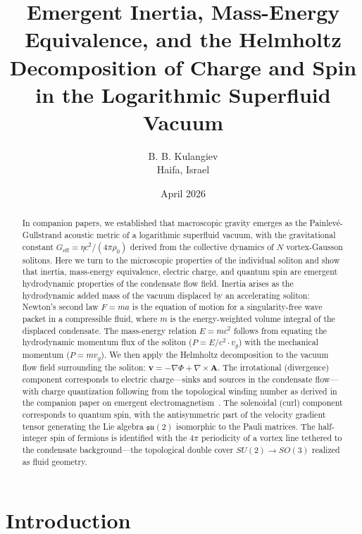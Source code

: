\documentclass[12pt, a4paper]{article}
\newcommand{\Geff}{G_{\mathrm{eff}}}
\begin{document}
\title{Emergent Inertia, Mass-Energy Equivalence, and the Helmholtz Decomposition of Charge and Spin\\
in the Logarithmic Superfluid Vacuum}

\author{B. B. Kulangiev\\\small{Haifa, Israel}}
\date{April 2026}
\maketitle

\begin{abstract}
\noindent
In companion papers, we established that macroscopic
gravity emerges as the Painlev\'{e}-Gullstrand
acoustic metric of a logarithmic superfluid vacuum,
with the gravitational constant
$\Geff = \eta c^2/(4\pi\rho_0)$ derived from the
collective dynamics of $N$ vortex-Gausson solitons.
Here we turn to the microscopic properties of the
individual soliton and show that inertia, mass-energy
equivalence, electric charge, and quantum spin are
emergent hydrodynamic properties of the condensate
flow field. Inertia arises as the hydrodynamic added
mass of the vacuum displaced by an accelerating
soliton: Newton's second law $F = ma$ is the
equation of motion for a singularity-free wave packet
in a compressible fluid, where $m$ is the
energy-weighted volume integral of the displaced
condensate. The mass-energy relation $E = mc^2$
follows from equating the hydrodynamic momentum flux
of the soliton ($P = E/c^2 \cdot v_g$) with the
mechanical momentum ($P = mv_g$). We then apply the
Helmholtz decomposition to the vacuum flow field
surrounding the soliton:
$\mathbf{v} = -\nabla\Phi + \nabla\times\mathbf{A}$.
The irrotational (divergence) component corresponds
to electric charge---sinks and sources in the
condensate flow---with charge quantization following
from the topological winding number as derived in the
companion paper on emergent
electromagnetism~\cite{kulangiev_maxwell}. The
solenoidal (curl) component corresponds to quantum
spin, with the antisymmetric part of the velocity
gradient tensor generating the Lie algebra
$\mathfrak{su}(2)$ isomorphic to the Pauli matrices.
The half-integer spin of fermions is identified with
the $4\pi$ periodicity of a vortex line tethered to
the condensate background---the topological double
cover $SU(2) \to SO(3)$ realized as fluid geometry.
\end{abstract}


\section{Introduction}
\label{sec:intro}
\end{document}
